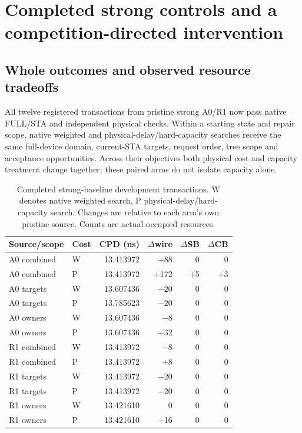 
\section{Completed strong controls and a competition-directed intervention}
\subsection{Whole outcomes and observed resource tradeoffs}
All twelve registered transactions from pristine strong A0/R1 now pass native FULL/STA and independent physical checks. Within a starting state and repair scope, native weighted and physical-delay/hard-capacity searches receive the same full-device domain, current-STA targets, request order, tree scope and acceptance opportunities. Across their objectives both physical cost and capacity treatment change together; these paired arms do not isolate capacity alone.

\begin{table}[t]
\centering\small
\caption{Completed strong-baseline development transactions. W denotes native weighted search, P physical-delay/hard-capacity search. Changes are relative to each arm's own pristine source. Counts are actual occupied resources.}
\begin{tabular}{llrrrr}
\hline
Source/scope & Cost & CPD (ns) & $\Delta$wire & $\Delta$SB & $\Delta$CB\\
\hline
A0 combined & W & 13.413972 & +88 & 0 & 0\\
A0 combined & P & 13.413972 & +172 & +5 & +3\\
A0 targets & W & 13.607436 & $-20$ & 0 & 0\\
A0 targets & P & 13.785623 & $-20$ & 0 & 0\\
A0 owners & W & 13.607436 & $-8$ & 0 & 0\\
A0 owners & P & 13.607436 & +32 & 0 & 0\\
R1 combined & W & 13.413972 & $-8$ & 0 & 0\\
R1 combined & P & 13.413972 & +8 & 0 & 0\\
R1 targets & W & 13.413972 & $-20$ & 0 & 0\\
R1 targets & P & 13.413972 & $-20$ & 0 & 0\\
R1 owners & W & 13.421610 & 0 & 0 & 0\\
R1 owners & P & 13.421610 & +16 & 0 & 0\\
\hline
\end{tabular}
\end{table}

